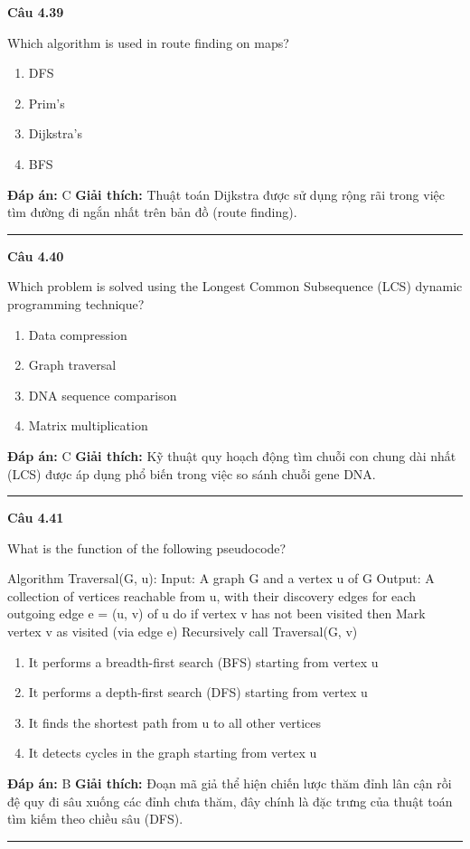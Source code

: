 \documentclass[11pt,a4paper]{article}
\newenvironment{question}[1]{%
  \par\vspace{1em}\noindent\textbf{\large Câu #1}\par\vspace{0.4em}
}{%
  \par\vspace{1em}\hrule\vspace{0.6em}
}
\newenvironment{choices}{%
  \begin{enumerate}[label=\textbf{\Alph*.},leftmargin=2.2em,itemsep=2pt,topsep=3pt]
}{%
  \end{enumerate}
}
\newcommand{\choice}{\item}
\newenvironment{codebox}{%
  \begin{tcolorbox}[colback=gray!8!white,colframe=gray!50!black,arc=1.5mm,boxrule=0.6pt,left=3mm,right=3mm,top=2.5mm,bottom=2.5mm]
  \ttfamily\small
}{%
  \end{tcolorbox}
}
\begin{document}
\begin{question}{4.39}
Which algorithm is used in route finding on maps?
\begin{choices}
\choice DFS
\choice Prim's
\choice Dijkstra's
\choice BFS
\end{choices}
\textbf{Đáp án:} C
\textbf{Giải thích:} Thuật toán Dijkstra được sử dụng rộng rãi trong việc tìm đường đi ngắn nhất trên bản đồ (route finding).
\end{question}

\begin{question}{4.40}
Which problem is solved using the Longest Common Subsequence (LCS) dynamic programming technique?
\begin{choices}
\choice Data compression
\choice Graph traversal
\choice DNA sequence comparison
\choice Matrix multiplication
\end{choices}
\textbf{Đáp án:} C
\textbf{Giải thích:} Kỹ thuật quy hoạch động tìm chuỗi con chung dài nhất (LCS) được áp dụng phổ biến trong việc so sánh chuỗi gene DNA.
\end{question}

\begin{question}{4.41}
What is the function of the following pseudocode?
\begin{codebox}
Algorithm Traversal(G, u):
    Input: A graph G and a vertex u of G
    Output: A collection of vertices reachable from u, with their discovery edges
    for each outgoing edge e = (u, v) of u do
        if vertex v has not been visited then
            Mark vertex v as visited (via edge e)
            Recursively call Traversal(G, v)
\end{codebox}
\begin{choices}
\choice It performs a breadth-first search (BFS) starting from vertex u
\choice It performs a depth-first search (DFS) starting from vertex u
\choice It finds the shortest path from u to all other vertices
\choice It detects cycles in the graph starting from vertex u
\end{choices}
\textbf{Đáp án:} B
\textbf{Giải thích:} Đoạn mã giả thể hiện chiến lược thăm đỉnh lân cận rồi đệ quy đi sâu xuống các đỉnh chưa thăm, đây chính là đặc trưng của thuật toán tìm kiếm theo chiều sâu (DFS).
\end{question}
\end{document}
